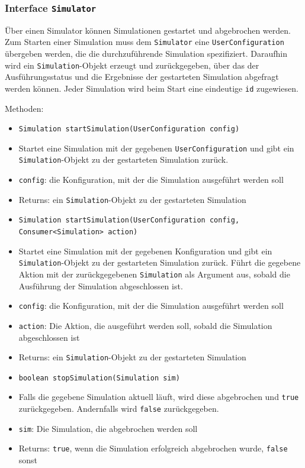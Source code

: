 \documentclass[parskip=full,11pt]{scrartcl}
\begin{document}
\subsubsection{Interface \texttt{Simulator}}
Über einen Simulator können Simulationen gestartet und abgebrochen werden. Zum Starten einer Simulation muss dem \texttt{Simulator} eine \texttt{UserConfiguration} übergeben werden, die die durchzuführende Simulation spezifiziert. Daraufhin wird ein \texttt{Simulation}-Objekt erzeugt und zurückgegeben, über das der Ausführungsstatus und die Ergebnisse der gestarteten Simulation abgefragt werden können. Jeder Simulation wird beim Start eine eindeutige \texttt{id} zugewiesen.

Methoden:
\begin{itemize} \itemsep -10pt
\item \texttt{Simulation startSimulation(UserConfiguration config)}
\item[] Startet eine Simulation mit der gegebenen \texttt{UserConfiguration} und gibt ein \texttt{Simulation}-Objekt zu der gestarteten Simulation zurück.
\item[]\texttt{config}: die Konfiguration, mit der die Simulation ausgeführt werden soll
\item[] Returns: ein \texttt{Simulation}-Objekt zu der gestarteten Simulation

\item \texttt{Simulation startSimulation(UserConfiguration config, Consumer<Simulation> action)}
\item[] Startet eine Simulation mit der gegebenen Konfiguration und gibt ein \texttt{Simulation}-Objekt zu der gestarteten Simulation zurück. Führt die gegebene Aktion mit der zurückgegebenen \texttt{Simulation} als Argument aus, sobald die Ausführung der Simulation abgeschlossen ist.
\item[] \texttt{config}: die Konfiguration, mit der die Simulation ausgeführt werden soll
\item[] \texttt{action}: Die Aktion, die ausgeführt werden soll, sobald die Simulation abgeschlossen ist
\item[] Returns: ein \texttt{Simulation}-Objekt zu der gestarteten Simulation

\item \texttt{boolean stopSimulation(Simulation sim)}
\item[] Falls die gegebene Simulation aktuell läuft, wird diese abgebrochen und \texttt{true} zurückgegeben. Andernfalls wird \texttt{false} zurückgegeben.
\item[] \texttt{sim}: Die Simulation, die abgebrochen werden soll
\item[] Returns: \texttt{true}, wenn die Simulation erfolgreich abgebrochen wurde, \texttt{false} sonst


\end{itemize}
\end{document}
